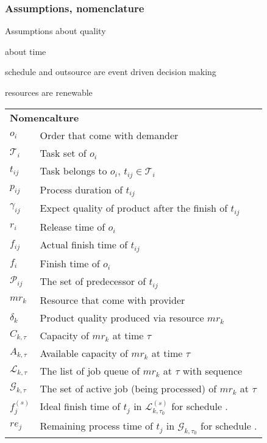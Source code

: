 
\subsubsection{Assumptions, nomenclature} %
\label{ssub:assumptions_nomenclature}
Assumptions about quality

about time

schedule and outsource are event driven decision making 

resources are renewable

\begin{table}[htbp]
  \scriptsize
\begin{tabularx}{\textwidth}{|lX|}
    \hline
    \multicolumn{2}{|l|}{\multirow{2}[0]{*}{\large\textbf{Nomencalture}}} \\
    \multicolumn{2}{|l|}{} \\
	$o_i$ & Order that come with demander \\
	$\mathcal{T}_i$ & Task set of $o_i$ \\
	$t_{ij}$ & Task belongs to $o_i$, $t_{ij}\in\mathcal{T}_i$ \\
	$p_{ij}$ & Process duration of $t_{ij}$\\
	$\gamma_{ij}$ & Expect quality of product after the finish of $t_{ij}$\\
	$r_i$ & Release time of $o_i$\\
	$f_{ij}$ & Actual finish time of $t_{ij}$ \\
	$f_{i}$ & Finish time of $o_i$\\
	$\mathcal{P}_{ij}$ & The set of predecessor of $t_{ij}$\\
	$mr_k$ & Resource that come with provider \\
	$\delta_k$ & Product quality produced via resource $mr_k$ \\
	$C_{k,\tau}$ & Capacity of $mr_k$ at time $\tau$\\
	$A_{k,\tau}$ & Available capacity of $mr_k$ at time $\tau$\\
	$\mathcal{L}_{k,\tau}$ & The list of job queue of $mr_k$ at $\tau$ with sequence\\
	$\mathcal{G}_{k,\tau}$ & The set of active job (being processed) of $mr_k$ at $\tau$ \\ 
	$f^{(s)}_j$ & Ideal finish time of $t_j$ in $\mathcal{L}^{(s)}_{k,\tau_0}$ for schedule . \\
	$re_j$ & Remaining process time of $t_j$ in $\mathcal{G}_{k,\tau_0}$ for schedule . \\

\end{tabularx}
\end{table}
